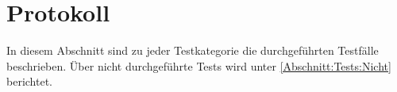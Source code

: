%



\newpage



\section{Protokoll}
\label{Abschnitt:Tests:Protokoll}

In diesem Abschnitt sind zu jeder Testkategorie die durchgeführten Testfälle beschrieben. Über nicht durchgeführte Tests wird unter \ref*{Abschnitt:Tests:Nicht} berichtet.








